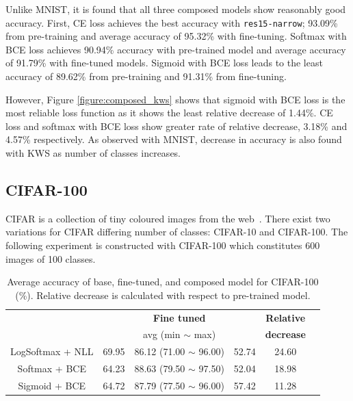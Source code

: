 \documentclass{article}
\begin{document}
Unlike MNIST, it is found that all three composed models show reasonably good accuracy. First, CE loss achieves the best accuracy with \texttt{res15-narrow}; 93.09\% from pre-training and average accuracy of 95.32\% with fine-tuning. Softmax with BCE loss achieves 90.94\% accuracy with pre-trained model and average accuracy of 91.79\% with fine-tuned models. Sigmoid with BCE loss leads to the least accuracy of 89.62\% from pre-training and 91.31\% from fine-tuning.

However, Figure \ref{figure:composed_kws} shows that sigmoid with BCE loss is the most reliable loss function as it shows the least relative decrease of 1.44\%. CE loss and softmax with BCE loss show greater rate of relative decrease, 3.18\% and 4.57\% respectively. As observed with MNIST, decrease in accuracy is also found with KWS as number of classes increases.

\subsection{CIFAR-100}
CIFAR is a collection of tiny coloured images from the web~\cite{krizhevsky2009learning}. There exist two variations for CIFAR differing number of classes: CIFAR-10 and CIFAR-100. The following experiment is constructed with CIFAR-100 which constitutes 600 images of 100 classes.

\begin{table}[t]
    \centering
    \begin{tabular}{cccccc}
        \toprule[1pt]
        \multirow{2}{*}{\raisebox{-3\heavyrulewidth}{\bf Loss function}} &
        \multirow{2}{*}{\raisebox{-3\heavyrulewidth}{\bf Pre-trained }} &
        \textbf{Fine tuned} &
        \multirow{2}{*}{\raisebox{-3\heavyrulewidth}{ \bf Composed }} &
        \textbf{ Relative } \\
        & & avg (min $\sim$ max) & & \textbf{ decrease } \\
        \midrule
        LogSoftmax + NLL & 69.95 & 86.12 (71.00 $\sim$ 96.00) & 52.74 & 24.60 \\
        Softmax + BCE & 64.23 & 88.63 (79.50 $\sim$ 97.50) & 52.04 & 18.98 \\
        Sigmoid + BCE & 64.72 & 87.79 (77.50 $\sim$ 96.00) & 57.42 & 11.28 \\
        \bottomrule[1pt]
    \end{tabular}
    \caption{Average accuracy of base, fine-tuned, and composed model for CIFAR-100 (\%). Relative decrease is calculated with respect to pre-trained model.}
    \label{table:cifar}
\end{table}
\end{document}
